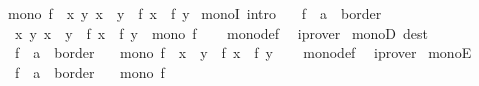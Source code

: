 \begin{isabellebody}
\ \ {\isachardoublequoteopen}mono\ f\ {\isasymlongleftrightarrow}\ {\isacharparenleft}{\kern0pt}{\isasymforall}x\ y{\isachardot}{\kern0pt}\ x\ {\isasymle}\ y\ {\isasymlongrightarrow}\ f\ x\ {\isasymle}\ f\ y{\isacharparenright}{\kern0pt}{\isachardoublequoteclose}\isanewline
\isanewline
{}\isamarkupfalse%
\ monoI\ {\isacharbrackleft}{\kern0pt}intro{\isacharquery}{\kern0pt}{\isacharbrackright}{\kern0pt}{\isacharcolon}{\kern0pt}\isanewline
\ \ \ f\ {\isacharcolon}{\kern0pt}{\isacharcolon}{\kern0pt}\ {\isachardoublequoteopen}{\isacharprime}{\kern0pt}a\ {\isasymRightarrow}\ {\isacharprime}{\kern0pt}b{\isacharcolon}{\kern0pt}{\isacharcolon}{\kern0pt}order{\isachardoublequoteclose}\isanewline
\ \ \ {\isachardoublequoteopen}{\isacharparenleft}{\kern0pt}{\isasymAnd}x\ y{\isachardot}{\kern0pt}\ x\ {\isasymle}\ y\ {\isasymLongrightarrow}\ f\ x\ {\isasymle}\ f\ y{\isacharparenright}{\kern0pt}\ {\isasymLongrightarrow}\ mono\ f{\isachardoublequoteclose}\isanewline
%
\isadelimproof
\ \ %
\endisadelimproof
%
\isatagproof
{}\isamarkupfalse%
\ mono{\isacharunderscore}{\kern0pt}def\ \isamarkupfalse%
\ iprover%
\endisatagproof
{\isafoldproof}%
%
\isadelimproof
\isanewline
%
\endisadelimproof
\isanewline
{}\isamarkupfalse%
\ monoD\ {\isacharbrackleft}{\kern0pt}dest{\isacharquery}{\kern0pt}{\isacharbrackright}{\kern0pt}{\isacharcolon}{\kern0pt}\isanewline
\ \ \ f\ {\isacharcolon}{\kern0pt}{\isacharcolon}{\kern0pt}\ {\isachardoublequoteopen}{\isacharprime}{\kern0pt}a\ {\isasymRightarrow}\ {\isacharprime}{\kern0pt}b{\isacharcolon}{\kern0pt}{\isacharcolon}{\kern0pt}order{\isachardoublequoteclose}\isanewline
\ \ \ {\isachardoublequoteopen}mono\ f\ {\isasymLongrightarrow}\ x\ {\isasymle}\ y\ {\isasymLongrightarrow}\ f\ x\ {\isasymle}\ f\ y{\isachardoublequoteclose}\isanewline
%
\isadelimproof
\ \ %
\endisadelimproof
%
\isatagproof
{}\isamarkupfalse%
\ mono{\isacharunderscore}{\kern0pt}def\ \isamarkupfalse%
\ iprover%
\endisatagproof
{\isafoldproof}%
%
\isadelimproof
\isanewline
%
\endisadelimproof
\isanewline
{}\isamarkupfalse%
\ monoE{\isacharcolon}{\kern0pt}\isanewline
\ \ \ f\ {\isacharcolon}{\kern0pt}{\isacharcolon}{\kern0pt}\ {\isachardoublequoteopen}{\isacharprime}{\kern0pt}a\ {\isasymRightarrow}\ {\isacharprime}{\kern0pt}b{\isacharcolon}{\kern0pt}{\isacharcolon}{\kern0pt}order{\isachardoublequoteclose}\isanewline
\ \ \ {\isachardoublequoteopen}mono\ f{\isachardoublequoteclose}\isanewline

\end{isabellebody}

